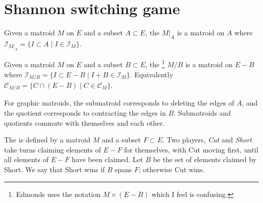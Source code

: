 \documentclass{article}
\newcommand*{\I}[0]{\mathcal{I}}
\newcommand*{\Cc}[0]{\mathcal{C}}
\begin{document}
\section*{Shannon switching game}

\begin{definition}
  Given a matroid $M$ on $E$ and a subset $A \subset E$, the  $M|_A$ is a matroid on $A$ where $\I_{M|_A} = \{I \subset A \mid I \in \I_M\}$.
\end{definition}

\begin{definition}
  Given a matroid $M$ on $E$ and a subset $B \subset E$, the \footnote{Edmonds uses the notation $M \times (E - B)$ which I feel is confusing.} $M/B$ is a matroid on $E - B$ where $\I_{M/B} = \{I \subset E - B \mid I + B \in \I_M\}$.  Equivalently $\Cc_{M/B} = \{C \cap (E - B) \mid C \in \Cc_M\}$.
\end{definition}

For graphic matroids, the submatroid corresponds to deleting the edges of $A$, and the quotient corresponds to contracting the edges in $B$.  Submatroids and quotients commute with themselves and each other.

\begin{definition}
  The  is defined by a matroid $M$ and a subset $F \subset E$.
  Two players, \emph{Cut} and \emph{Short} take turns claiming elements of $E - F$ for themselves, with Cut moving first, until all elements of $E - F$ have been claimed.
  Let $B$ be the set of elements claimed by Short.
  We say that Short wins if $B$ spans $F$; otherwise Cut wins.
\end{definition}

\end{document}
